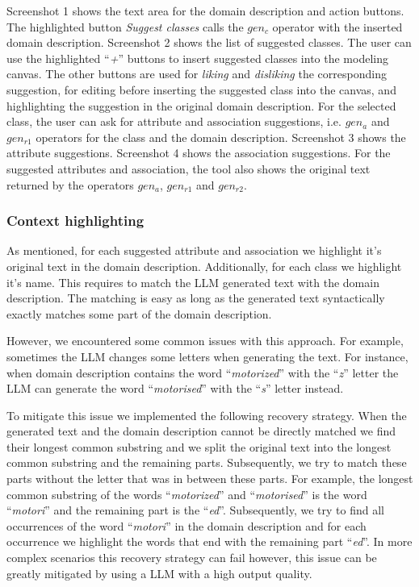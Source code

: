 Screenshot 1 shows the text area for the domain description and action buttons. The highlighted button \textit{Suggest classes} calls the $gen_c$ operator with the inserted domain description. Screenshot 2 shows the list of suggested classes. The user can use the highlighted ``\textit{+}'' buttons to insert suggested classes into the modeling canvas. The other buttons are used for \textit{liking} and \textit{disliking} the corresponding suggestion, for editing before inserting the suggested class into the canvas, and highlighting the suggestion in the original domain description. For the selected class, the user can ask for attribute and association suggestions, i.e. $gen_a$ and $gen_{r1}$ operators for the class and the domain description. Screenshot 3 shows the attribute suggestions. Screenshot 4 shows the association suggestions. For the suggested attributes and association, the tool also shows the original text returned by the operators $gen_a$, $gen_{r1}$ and $gen_{r2}$.


\subsubsection{Context highlighting}

As mentioned, for each suggested attribute and association we highlight it's original text in the domain description. Additionally, for each class we highlight it's name. This requires to match the LLM generated text with the domain description. The matching is easy as long as the generated text syntactically exactly matches some part of the domain description.

However, we encountered some common issues with this approach. For example, sometimes the LLM changes some letters when generating the text. For instance, when domain description contains the word ``\textit{motorized}'' with the ``\textit{z}'' letter the LLM can generate the word ``\textit{motorised}'' with the ``\textit{s}'' letter instead.

To mitigate this issue we implemented the following recovery strategy. When the generated text and the domain description cannot be directly matched we find their longest common substring and we split the original text into the longest common substring and the remaining parts. Subsequently, we try to match these parts without the letter that was in between these parts. For example, the longest common substring of the words ``\textit{motorized}'' and ``\textit{motorised}'' is the word ``\textit{motori}'' and the remaining part is the ``{\textit{ed}}''. Subsequently, we try to find all occurrences of the word ``\textit{motori}'' in the domain description and for each occurrence we highlight the words that end with the remaining part ``\textit{ed}''. In more complex scenarios this recovery strategy can fail however, this issue can be greatly mitigated by using a LLM with a high output quality.


